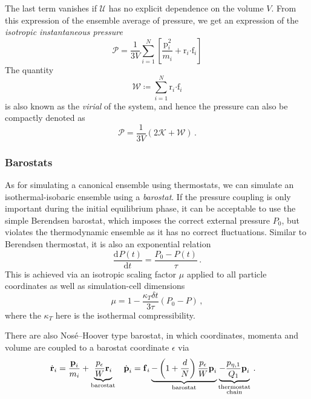 \documentclass{article}
\theoremstyle{plain}\theoremheaderfont{\normalfont\itshape}\theorembodyfont{\rmfamily}\theoremseparator{.}\newtheorem*{rem}{Remark}\newtheorem*{ex}{Example}\newtheorem*{proof}{Proof}\newtheorem*{altp}{Alternative proof}
\theoremstyle{plain}\theoremheaderfont{\normalfont\bfseries}\theorembodyfont{\rmfamily}\theoremseparator{.}\newtheorem{thm}{Theorem}[section]\newtheorem{lem}[thm]{Lemma}\newtheorem{prop}[thm]{Proposition}\newtheorem*{cor}{Corollary}\newtheorem{defn}[thm]{Definition}\newtheorem{clm}[thm]{Claim}\newtheorem{clminproof}{Claim}\newtheorem{alg}[thm]{Algorithm}\newtheorem{hyp}[thm]{Hypothesis}\newtheorem{law}[thm]{Law}
\theoremstyle{break}\theoremheaderfont{\normalfont\itshape}\theorembodyfont{\rmfamily}\theoremseparator{.\medskip}\newtheorem*{proofskip}{Proof}\newtheorem*{exs}{Examples}\newtheorem*{rems}{Remarks}
\theoremstyle{break}\theoremheaderfont{\normalfont\bfseries}\theorembodyfont{\rmfamily}\theoremseparator{.\medskip}\newtheorem{lemskip}[thm]{Lemma}\newtheorem{defnskip}[thm]{Definition}\newtheorem{propskip}[thm]{Proposition}\newtheorem{thmskip}[thm]{Theorem}
\numberwithin{equation}{section}
\newcommand{\dv}[3][]{\frac{\mathrm{d}^{#1} #2}{{\mathrm{d} #3}^{#1}}}
\newcommand{\vb}[1]{\bm{\mathrm{#1}}}
\newcommand{\vdot}{\bm{\cdot}}
\begin{document}
    The last term vanishes if \(\mathcal{U}\) has no explicit dependence on the volume \(V\). From this expression of the ensemble average of pressure, we get an expression of the \textit{isotropic instantaneous pressure}
    \begin{equation}
        \mathcal{P}=\frac{1}{3V}\sum_{i=1}^{N}\left[\frac{\vb{p}_i^2}{m_i}+\vb{r}_i\vdot\vb{f}_i\right]
    \end{equation}
    The quantity
    \begin{equation}
        \mathcal{W}\coloneqq\sum_{i=1}^{N}\vb{r}_i\vdot\vb{f}_i
    \end{equation}
    is also known as the \textit{virial} of the system, and hence the pressure can also be compactly denoted as
    \begin{equation}
        \mathcal{P}=\frac{1}{3V}\left(2\mathcal{K}+\mathcal{W}\right)\,.
    \end{equation}

    \subsubsection{Barostats}
    As for simulating a canonical ensemble using thermostats, we can simulate an isothermal-isobaric ensemble using a \textit{barostat}. If the pressure coupling is only important during the initial equilibrium phase, it can be acceptable to use the simple Berendsen barostat, which imposes the correct external pressure \(P_0\), but violates the thermodynamic ensemble as it has no correct fluctuations. Similar to Berendsen thermostat, it is also an exponential relation
    \begin{equation}
        \dv{P(t)}{t}=\frac{P_0-P(t)}{\tau}\,.
    \end{equation}
    This is achieved via an isotropic scaling factor \(\mu\) applied to all particle coordinates as well as simulation-cell dimensions
    \begin{equation}
        \mu=1-\frac{\kappa_T\delta t}{3\tau}(P_0-P)\,,
    \end{equation}
    where the \(\kappa_T\) here is the isothermal compressibility.

    There are also Nos\'{e}--Hoover type barostat, in which coordinates, momenta and volume are coupled to a barostat coordinate \(\epsilon\) via
    \begin{align}
        \dot{\vb{r}}_i&=\frac{\vb{p}_i}{m_i}+\underbrace{\frac{p_\epsilon}{W}\vb{r}_i}_{\text{barostat}} & \dot{\vb{p}}_i&=\vb{f}_i\underbrace{-\left(1+\frac{d}{N}\right)\frac{p_\epsilon}{W}\vb{p}_i}_{\text{barostat}}\underbrace{-\frac{p_{\eta,1}}{Q_1}\vb{p}_i}_{\begin{subarray}{c}\text{thermostat} \\ \text{chain}\end{subarray}}\,.
    \end{align}
\end{document}
